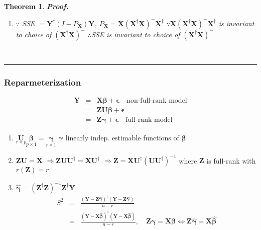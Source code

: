 \documentclass{article}
\newtheorem{theorem}{Theorem}
\newenvironment{proof}[1][Proof]{\noindent\textbf{#1.} }{\ \rule{0.5em}{0.5em}}
\begin{document}
\begin{theorem}
\begin{proof}
\begin{enumerate}
\item $\because $ SSE $=\mathbf{Y}^{\dagger }\left( I-P_{\mathbf{X}}\right) 
\mathbf{Y}$, $P_{\mathbf{X}}=\mathbf{X}\left( \mathbf{X}^{\dagger }\mathbf{X}%
\right) ^{-}\mathbf{X}^{\dagger }$\newline
$\because \mathbf{X}\left( \mathbf{X}^{\dagger }\mathbf{X}\right) ^{-}%
\mathbf{X}^{\dagger }$ is invariant to choice of $\left( \mathbf{X}^{\dagger
}\mathbf{X}\right) ^{-}$\newline
$\therefore $SSE is invariant to choice of $\left( \mathbf{X}^{\dagger }%
\mathbf{X}\right) ^{-}$
\end{enumerate}
\end{proof}
\end{theorem}

\bigskip

\subsubsection{Reparmeterization}

\begin{eqnarray*}
\mathbf{Y} &=&\mathbf{X\beta +\epsilon \quad }\text{non-full-rank model} \\
&=&\mathbf{ZU\beta +\epsilon } \\
&=&\mathbf{Z\gamma +\epsilon \quad }\text{full-rank model}
\end{eqnarray*}

\begin{enumerate}
\item $\underset{r\times p}{\mathbf{U}}\underset{p\times 1}{\mathbf{\beta }}%
\mathbf{=}\underset{r\times 1}{\mathbf{\gamma }}$\newline
$\mathbf{\gamma }$ linearly indep. estimable functions of $\mathbf{\beta }$

\item $\mathbf{ZU=X}$\newline
$\Rightarrow \mathbf{ZUU}^{\dagger }=\mathbf{XU}^{\dagger }$\newline
$\Rightarrow \mathbf{Z=XU}^{\dagger }\left( \mathbf{UU}^{\dagger }\right)
^{-1}$ where $\mathbf{Z}$ is full-rank with $r\left( \mathbf{Z}\right) =r$

\item $\mathbf{\hat{\gamma}=}\left( \mathbf{Z^{\dagger }Z}\right) ^{-1}%
\mathbf{Z^{\dagger }Y}$%
\begin{eqnarray*}
S^{2} &=&\frac{\left( \mathbf{Y-Z\hat{\gamma}}\right) ^{\dagger }\left( 
\mathbf{Y-Z\hat{\gamma}}\right) }{n-r} \\
&=&\frac{\left( \mathbf{Y}-\mathbf{X\hat{\beta}}\right) ^{\dagger }\left( 
\mathbf{Y}-\mathbf{X\hat{\beta}}\right) }{n-r},\quad \mathbf{Z\gamma =X\beta 
}\Leftrightarrow \mathbf{Z\hat{\gamma}=X\hat{\beta}}
\end{eqnarray*}
\end{enumerate}
\end{document}
